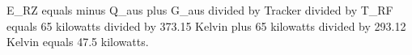 E_RZ equals minus Q_aus plus G_aus divided by Tracker divided by T_RF equals 65 kilowatts divided by 373.15 Kelvin plus 65 kilowatts divided by 293.12 Kelvin equals 47.5 kilowatts.